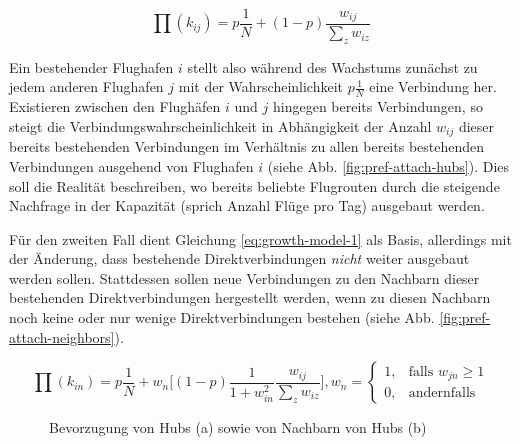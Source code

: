 \begin{equation}
    \label{eq:growth-model-1}
    \prod (k_{ij}) = p\frac{1}{N} + (1-p)\frac{w_{ij}}{\sum_{z}w_{iz}}
\end{equation}

Ein bestehender Flughafen $i$ stellt also während des Wachstums zunächst zu jedem anderen Flughafen $j$ mit der Wahrscheinlichkeit
$p \frac{1}{N}$ eine Verbindung her.
Existieren zwischen den Flughäfen $i$ und $j$ hingegen bereits Verbindungen, so steigt die Verbindungswahrscheinlichkeit in Abhängigkeit
der Anzahl $w_{ij}$ dieser bereits bestehenden Verbindungen im Verhältnis zu allen bereits bestehenden Verbindungen ausgehend von Flughafen $i$ (siehe Abb. \ref{fig:pref-attach-hubs}).
Dies soll die Realität beschreiben, wo bereits beliebte Flugrouten durch die steigende Nachfrage in der Kapazität (sprich Anzahl Flüge pro Tag)
ausgebaut werden.

Für den zweiten Fall dient Gleichung \ref{eq:growth-model-1} als Basis, allerdings mit der Änderung, dass bestehende Direktverbindungen \textit{nicht} weiter
ausgebaut werden sollen.
Stattdessen sollen neue Verbindungen zu den Nachbarn dieser bestehenden Direktverbindungen hergestellt werden, wenn zu diesen Nachbarn noch keine
oder nur wenige Direktverbindungen bestehen (siehe Abb. \ref{fig:pref-attach-neighbors}).

\begin{equation}
    \label{eq:growth-model-2}
    \prod (k_{in}) = p\frac{1}{N} + w_{n}\Bigg[ (1-p)\frac{1}{1 + w_{in}^{2}}\frac{w_{ij}}{\sum_{z}w_{iz}} \Bigg], w_{n} = \begin{cases}1,& \text{falls } w_{jn}\geq 1\\ 0, & \text{andernfalls}
    \end{cases}
\end{equation}

\begin{figure}
    \centering
     \hspace{4em}
    \label{fig:pref-attach}
    \caption{Bevorzugung von Hubs (a) sowie von Nachbarn von Hubs (b)}
\end{figure}


